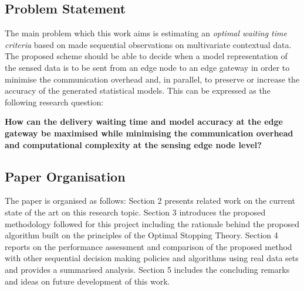 \documentclass{mpaper}
\begin{document}
\subsection*{Problem Statement}
The main problem which this work aims is estimating an \textit{optimal waiting time criteria} based on made sequential observations on multivariate contextual data. The proposed scheme should be able to decide when a model representation of the sensed data is to be sent from an edge node to an edge gateway in order to minimise the communication overhead and, in parallel, to preserve or increase the accuracy of the generated statistical models. This can be expressed as the following research question:


\textbf{How can the delivery waiting time and model accuracy at the edge gateway be maximised while minimising the communication overhead and computational complexity at the sensing edge node level?}

\subsection*{Paper Organisation}
The paper is organised as follows: Section 2 presents related work on the current state of the art on this research topic. Section 3 introduces the proposed methodology followed for this project including the rationale behind the proposed algorithm built on the principles of the Optimal Stopping Theory. Section 4 reports on the performance assessment and comparison of the proposed method with other sequential decision making policies and algorithms using real data sets and provides a summarised analysis. Section 5 includes the concluding remarks and ideas on future development of this work.
\end{document}

